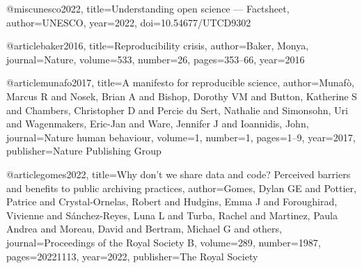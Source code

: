 @misc{unesco2022,
  title={Understanding open science — Factsheet},
  author={UNESCO},
  year={2022},
  doi={10.54677/UTCD9302}
}

@article{baker2016,
  title={Reproducibility crisis},
  author={Baker, Monya},
  journal={Nature},
  volume={533},
  number={26},
  pages={353--66},
  year={2016}
}

@article{munafo2017,
  title={A manifesto for reproducible science},
  author={Munaf{\`o}, Marcus R and Nosek, Brian A and Bishop, Dorothy VM and Button, Katherine S and Chambers, Christopher D and Percie du Sert, Nathalie and Simonsohn, Uri and Wagenmakers, Eric-Jan and Ware, Jennifer J and Ioannidis, John},
  journal={Nature human behaviour},
  volume={1},
  number={1},
  pages={1--9},
  year={2017},
  publisher={Nature Publishing Group}
}

@article{gomes2022,
  title={Why don't we share data and code? Perceived barriers and benefits to public archiving practices},
  author={Gomes, Dylan GE and Pottier, Patrice and Crystal-Ornelas, Robert and Hudgins, Emma J and Foroughirad, Vivienne and S{\'a}nchez-Reyes, Luna L and Turba, Rachel and Martinez, Paula Andrea and Moreau, David and Bertram, Michael G and others},
  journal={Proceedings of the Royal Society B},
  volume={289},
  number={1987},
  pages={20221113},
  year={2022},
  publisher={The Royal Society}
}